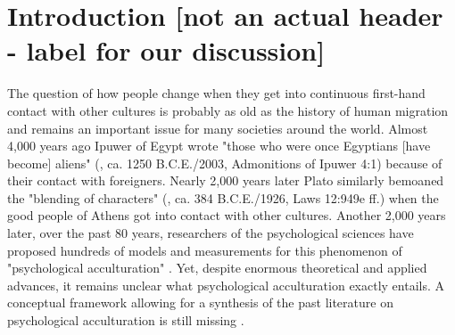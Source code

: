 \documentclass[man, 12pt, a4paper]{apa7}
\begin{document}
%
%
%

\section{Introduction [not an actual header - label for our discussion]}

The question of how people change when they get into continuous first-hand contact with other cultures is probably as old as the history of human migration and remains an important issue for many societies around the world. 
Almost 4,000 years ago Ipuwer of Egypt wrote "those who were once Egyptians [have become] aliens" (\citeauthor{Ipuwer2003}, ca. 1250 B.C.E./2003, Admonitions of Ipuwer 4:1) because of their contact with foreigners. Nearly 2,000 years later Plato similarly bemoaned the "blending of characters" (\citeauthor{Plato1926}, ca. 384 B.C.E./1926, Laws 12:949e ff.) when the good people of Athens got into contact with other cultures. Another 2,000 years later, over the past 80 years, researchers of the psychological sciences have proposed hundreds of models and measurements for this phenomenon of "psychological acculturation" \citep[][]{Rudmin2003a}. Yet, despite enormous theoretical and applied advances, it remains unclear what psychological acculturation exactly entails. A conceptual framework allowing for a synthesis of the past literature on psychological acculturation is still missing \citep{Birman2014c}.
\end{document}
